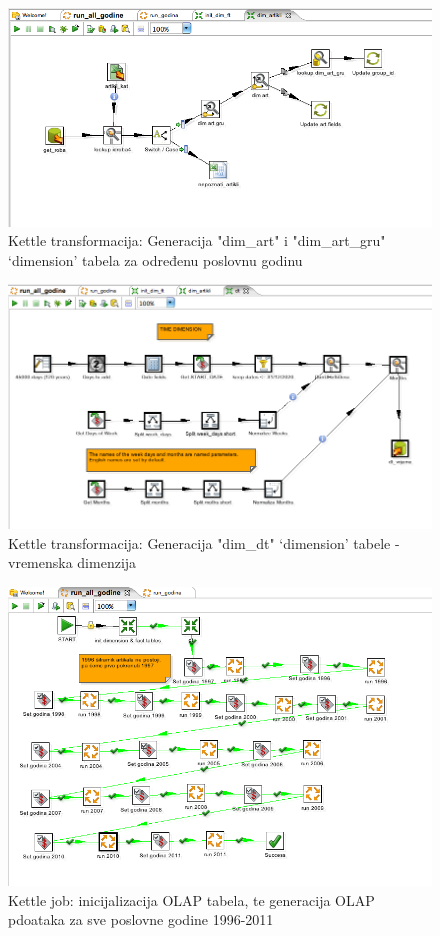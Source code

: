 \documentclass[times, utf8, seminar]{fit}
\begin{document}
\begin{figure}[H]
\centering
\includegraphics[width=15cm]{img/kettle_tr_dim_artikli.png}
\caption{Kettle transformacija: Generacija "dim\_art" i "dim\_art\_gru" `dimension' tabela za određenu poslovnu godinu}
\end{figure}


\begin{figure}[H]
\centering
\includegraphics[width=15cm]{img/kettle_tr_dt.png}
\caption{Kettle transformacija: Generacija "dim\_dt" `dimension' tabele - vremenska dimenzija}
\end{figure}


\begin{figure}[H]
\centering
\includegraphics[width=15cm]{img/kettle_job_run_all.png}
\caption{Kettle job: inicijalizacija OLAP tabela, te generacija OLAP pdoataka za sve poslovne godine 1996-2011}
\end{figure}
\end{document}
